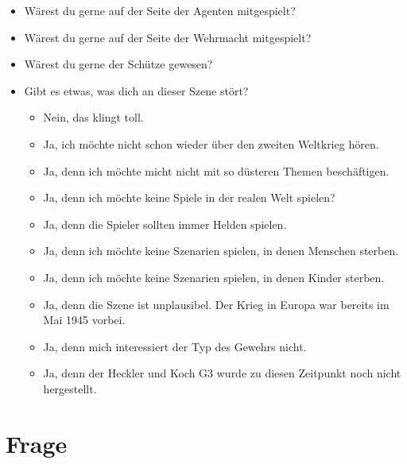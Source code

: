 \documentclass{article}
\newcommand\frage[1]{\section{Frage}\label{#1}}
\begin{document}
\begin{itemize}
\item  Wärest du gerne auf der Seite der Agenten mitgespielt?
\item  Wärest du gerne auf der Seite der Wehrmacht mitgespielt?
\item  Wärest du gerne der Schütze gewesen?
\item  Gibt es etwas, was dich an dieser Szene stört?
  \begin{itemize}
  \item Nein, das klingt toll.
  \item Ja, ich möchte nicht schon wieder über den zweiten Weltkrieg hören.
  \item Ja, denn ich möchte micht nicht mit so düsteren Themen beschäftigen.
  \item Ja, denn ich möchte keine Spiele in der realen Welt spielen?
  \item Ja, denn die Spieler sollten immer Helden spielen.
  \item Ja, denn ich möchte keine Szenarien spielen, in denen Menschen sterben.
  \item Ja, denn ich möchte keine Szenarien spielen, in denen Kinder sterben.
  \item Ja, denn die Szene ist unplausibel. Der Krieg in Europa war bereits im Mai 1945 vorbei.
  \item Ja, denn mich interessiert der Typ des Gewehrs nicht.
  \item Ja, denn der Heckler und Koch G3 wurde zu diesen Zeitpunkt noch nicht hergestellt.
  \end{itemize}
\end{itemize}

\frage{steampunk}
\end{document}
